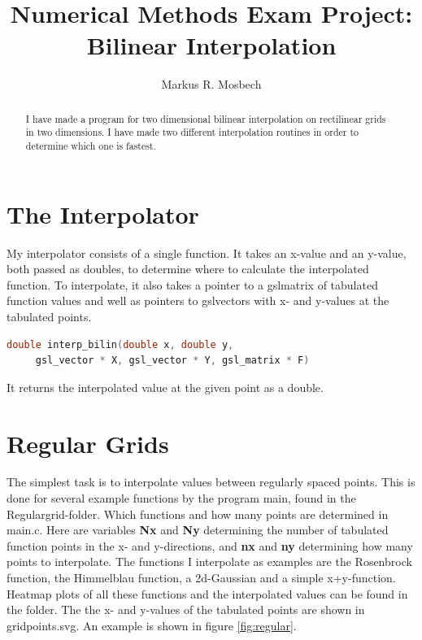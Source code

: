 \documentclass[a4paper, UKenglish]{article}
\title{Numerical Methods Exam Project: Bilinear Interpolation}
\author{Markus R. Mosbech}
\begin{document}
\maketitle

\begin{abstract}
\noindent I have made a program for two dimensional bilinear interpolation on rectilinear grids in two dimensions. I have made two different interpolation routines in order to determine which one is fastest.
\end{abstract}
\section{The Interpolator}
My interpolator consists of a single function. It takes an x-value and an y-value, both passed as doubles, to determine where to calculate the interpolated function. To interpolate, it also takes a pointer to a gsl\textunderscore{}matrix of tabulated function values and well as pointers to gsl\textunderscore{}vectors with x- and y-values at the tabulated points.
\begin{mdframed}[backgroundcolor=mygrey,linecolor=mygrey]
	\begin{lstlisting}[language=c]
double interp_bilin(double x, double y,
	 gsl_vector * X, gsl_vector * Y, gsl_matrix * F)
	\end{lstlisting}
\end{mdframed}
It returns the interpolated value at the given point as a double.

\section{Regular Grids}
The simplest task is to interpolate values between regularly spaced points. This is done for several example functions by the program main, found in the Regular\textunderscore{}grid-folder. Which functions and how many points are determined in main.c. Here are variables \textbf{Nx} and \textbf{Ny} determining the number of tabulated function points in the x- and y-directions, and \textbf{nx} and \textbf{ny} determining how many points to interpolate. The functions I interpolate as examples are the Rosenbrock function, the Himmelblau function, a 2d-Gaussian and a simple x+y-function. Heatmap plots of all these functions and the interpolated values can be found in the folder. The the x- and y-values of the tabulated points are shown in gridpoints.svg. An example is shown in figure \ref{fig:regular}.
\end{document}
